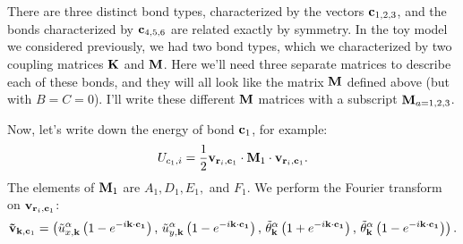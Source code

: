 \documentclass[12pt]{article}
\begin{document}
There are three distinct bond types, characterized by the vectors $\mathbf{c}_{1,2,3}$, and the bonds characterized by $\mathbf{c}_{4,5,6}$ are related exactly by symmetry. In the toy model we considered previously, we had two bond types, which we characterized by two coupling matrices $\mathbf{K}$ and $\mathbf{M}$. Here we'll need three separate matrices to describe each of these bonds, and they will all look like the matrix $\mathbf{M}$ defined above (but with $B=C=0$). I'll write these different $\mathbf{M}$ matrices with a subscript $\mathbf{M}_{a=1,2,3}$.

Now, let's write down the energy of bond $\mathbf{c}_1$, for example:
\[ U_{c_1,i} = \frac{1}{2} \mathbf{v}_{\mathbf{r}_i, \mathbf{c}_1} \cdot \mathbf{M}_1 \cdot \mathbf{v}_{\mathbf{r}_i,\mathbf{c}_1}.\]
The elements of $\mathbf{M}_1$ are $A_1,D_1,E_1,$ and $F_1$. We perform the Fourier transform on $\mathbf{v}_{\mathbf{r}_i,\mathbf{c}_1}$:
\[ \mathbf{\tilde v}_{\mathbf{k},\mathbf{c}_1} = \left( \tilde u_{x,\mathbf{k}}^\alpha \left(1-e^{-i\mathbf{k}\cdot\mathbf{c_1}}\right), \, \tilde u_{y,\mathbf{k}}^\alpha\left(1-e^{-i\mathbf{k}\cdot\mathbf{c_1}}\right), \, \tilde {\theta}_{\mathbf{k}}^\alpha \left(1+e^{-i\mathbf{k}\cdot\mathbf{c_1} } \right), \, \tilde {\theta}_{\mathbf{k}}^\alpha \left(1-e^{-i\mathbf{k}\cdot\mathbf{c_1} } \right)   \right).\]

\end{document}
